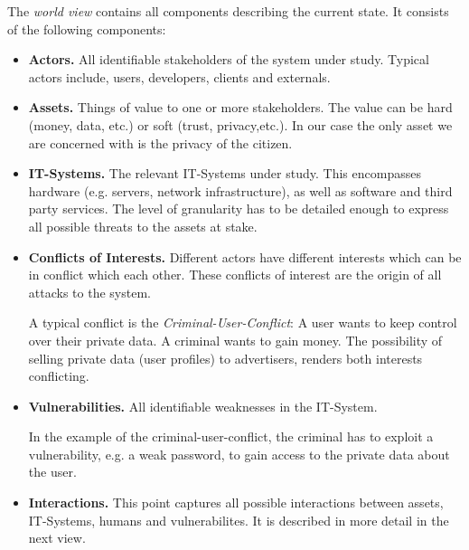 The \emph{world view} contains all components describing the current state.
It consists of the following components:
\begin{itemize}
\item \textbf{Actors.}
All identifiable stakeholders of the system under study.
Typical actors include, users, developers, clients and externals.

\item
\textbf{Assets.} Things of value to one or more stakeholders.
The value can be hard (money, data, etc.) or soft (trust, privacy,etc.).
In our case the only asset we are concerned with is the privacy of the citizen.

\item \textbf{IT-Systems.}
The relevant IT-Systems under study. This encompasses hardware (e.g. servers, network infrastructure), as well as software and third party services.
The level of granularity has to be detailed enough to express all possible threats to the assets at stake.

\item \textbf{Conflicts of Interests.}
Different actors have different interests which can be in conflict which each other.
These conflicts of interest are the origin of all attacks to the system.

A typical conflict is the \emph{Criminal-User-Conflict}:
A user wants to keep control over their private data.
A criminal wants to gain money.
The possibility of selling private data (user profiles) to advertisers, renders both interests conflicting.

\item \textbf{Vulnerabilities.}
All identifiable weaknesses in the IT-System.

In the example of the criminal-user-conflict, the criminal has to exploit a vulnerability, e.g. a weak password, to gain access to the private data about the user.

\item \textbf{Interactions.}
This point captures all possible interactions between assets, IT-Systems, humans and vulnerabilites.
It is described in more detail in the next view.
\end{itemize}





